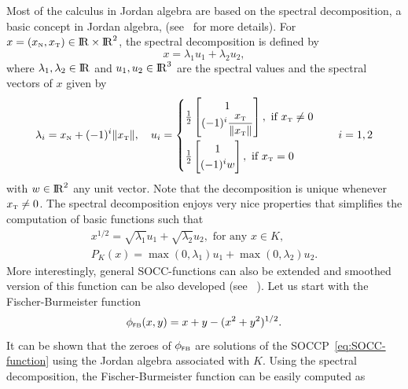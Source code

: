 {Most of the calculus in Jordan algebra are based on the spectral decomposition, a basic concept in Jordan algebra, (see~\cite{Fukushima.ea2001} for more details).
For $x = (x_{\hbox{\tiny{N}}}, x_{\hbox{\tiny{T}}})\in \mathrm{I\!R}\times \mathrm{I\!R}^2$, the spectral decomposition is defined by
\begin{equation}
  \label{eq:Jordan-spectraldecomposition}
  x = \lambda_1 u_1 + \lambda_2 u_2,
\end{equation}
where $\lambda_1,\lambda_2\in \mathrm{I\!R}$ and $u_1,u_2\in\mathrm{I\!R}^3$ are the spectral values and the spectral vectors of $x$ given by
\begin{equation}
  \label{eq:Jordan-spectraldecomposition1}
    \lambda_i= x_\n + (-1)^i \|x_\t\|, \quad
    u_i =
    \begin{cases}
      \frac{1}{2}
      \begin{bmatrix}
        1 \\
        (-1)^i \Frac{x_\t}{\|x_\t\|}
      \end{bmatrix}, \text{ if } x_\t\neq 0 \\[5mm]
       \frac{1}{2}
      \begin{bmatrix}
        1 \\
        (-1)^i w
      \end{bmatrix}, \text{ if } x_\t = 0 \\
    \end{cases} \quad i = 1,2
\end{equation}
with $w\in\mathrm{I\!R}^2$ {any unit vector}. Note that the decomposition is unique {whenever $x_{\hbox{\tiny{T}}}\neq 0$}. The spectral decomposition enjoys very nice properties that {simplifies} the computation of basic functions such that
\begin{equation}
  \label{eq:Jordan-spectraldecomposition2}
  \begin{array}{l}
    x^{1/2} = \sqrt{\lambda_1} u_1 + \sqrt{\lambda_2} u_2, \text{ for any }  x \in K, \\[1mm]
    P_K(x) = \max(0,\lambda_1) u_1 + \max(0,\lambda_2) u_2. 
  \end{array}
\end{equation}
More interestingly,  general SOCC-functions can also be extended and smoothed version of this function can be also developed (see~\cite{Fukushima.ea2001}
). Let us start with the Fischer-Burmeister function
\begin{equation}
  \label{eq:Jordan-FB}
  \phi_{\fb}(x,y) = x+y - (x^2 + y^2 )^{1/2}.
\end{equation}
It can be shown that the zeroes of $\phi_{{\hbox{\tiny{\textsf FB}}}}$ are solutions of the SOCCP~\eqref{eq:SOCC-function} using the Jordan algebra associated with $K$. Using the spectral decomposition, the Fischer-Burmeister function can be easily computed as
}

